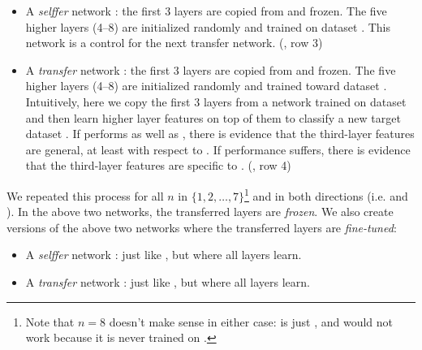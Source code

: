 \begin{itemize}[leftmargin=2em]
\item A \emph{selffer} network :  the first $3$ layers are copied from  and frozen. The five higher layers (4--8) are initialized randomly and trained on dataset \dB. This network is a control for the next transfer network. (, row 3)

\item A \emph{transfer} network : the first $3$ layers are copied from  and frozen. The five higher layers (4--8) are initialized randomly and trained toward dataset \dB. Intuitively, here we copy the first $3$ layers from a network trained on dataset \dA and then learn higher layer features on top of them to classify a new target dataset \dB. If  performs as well as , there is evidence that the third-layer features are general, at least with respect to \dB. If performance suffers, there is evidence that the third-layer features are specific to \dA. (, row 4)
\end{itemize}

We repeated this process for all $n$ in $\{1, 2, \ldots, 7\}$\footnote{Note that $n=8$ doesn't make sense in either case:  is just ,
and  would not work because it is never trained on \dB.} and in both directions (i.e.  and ).
In the above two networks, the transferred layers are \emph{frozen}. We also create versions of the above two networks where the transferred layers are \emph{fine-tuned}:

\begin{itemize}[leftmargin=2em]
\item A \emph{selffer} network : just like , but where all layers learn.
\item A \emph{transfer} network : just like , but where all layers learn.
\end{itemize}


